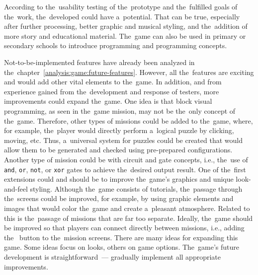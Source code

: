 \begin{conclusion}
\pagebreak
According to the~usability testing of the~prototype and the~fulfilled goals of the~work, the~developed could have a~potential.
That can be true, especially after further processing, better graphic and musical styling, and the~addition of more story and educational material.
The~game can also be used in primary or secondary schools to introduce programming and programming concepts.

Not-to-be-implemented features have already been analyzed in the~chapter~\ref{analysis:game:future-features}.
However, all the~features are exciting and would add other vital elements to the~game.
In addition, and from experience gained from the~development and response of testers, more improvements could expand the~game.
One idea is that block visual programming, as seen in the~game mission, may not be the~only concept of the~game.
Therefore, other types of missions could be added to the~game, where, for example, the~player would directly perform a~logical puzzle by clicking, moving, etc.
Thus, a~universal system for puzzles could be created that would allow them to be generated and checked using pre-prepared configurations.
Another type of mission could be with circuit and gate concepts, i.e., the~use of \texttt{and}, \texttt{or}, \texttt{not}, or \texttt{xor} gates to achieve the~desired output result.
One of the~first extensions could and should be to improve the~game's graphics and unique look-and-feel styling.
Although the~game consists of tutorials, the~passage through the~screens could be improved, for example, by using graphic elements and images that would color the~game and create a~pleasant atmosphere.
Related to this is the~passage of missions that are far too separate.
Ideally, the~game should be improved so that players can connect directly between missions, i.e., adding the~ button to the~mission screens.
There are many ideas for expanding this game.
Some ideas focus on looks, others on game options.
The~game's future development is straightforward~--- gradually implement all appropriate improvements.

\end{conclusion}
